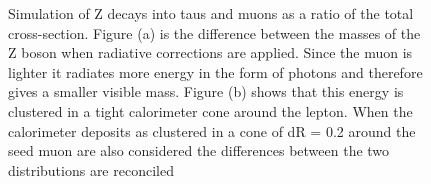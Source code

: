 \begin{figure}[h!]
  \centering
   \caption{Simulation of Z decays into taus and muons as a ratio of the total cross-section. Figure (a) is the difference between the masses of the Z boson when radiative corrections are applied. Since the muon is lighter it radiates more energy in the form of photons and therefore gives a smaller visible mass. Figure (b) shows that this energy is clustered in a tight calorimeter cone around the lepton. When the calorimeter deposits as clustered in a cone of dR = 0.2 around the seed muon are also considered the differences between the two distributions are reconciled}
  \label{fig:ysf}
\end{figure}